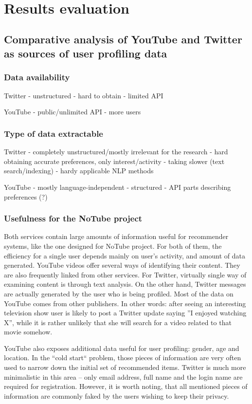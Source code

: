 \section{Results evaluation}

\subsection{Comparative analysis of YouTube and Twitter as sources of user
profiling data}

\subsubsection{Data availability}
Twitter
- unstructured
- hard to obtain
- limited API

YouTube
- public/unlimited API
- more users

\subsubsection{Type of data extractable}
Twitter
- completely unstructured/mostly irrelevant for the research
- hard obtaining accurate preferences, only interest/activity
- taking slower (text search/indexing)
- hardy applicable NLP methods

YouTube
- mostly language-independent
- structured
- API parts describing preferences (?)

\subsubsection{Usefulness for the NoTube project}

Both services contain large amounts of information useful for recommender
systems, like the one designed for NoTube project. For both of them, the
efficiency for a single user depends mainly on user's activity, and amount of
data generated. YouTube videos offer several ways of identifying their content.
They are also frequently linked from other services. For Twitter, virtually single
way of examining content is through text analysis. On the other hand, Twitter
messages are actually generated by the user who is being profiled. Most of the data
on YouTube comes from other publishers. In other words: after seeing an
interesting television show user is likely to post a Twitter update saying ''I
enjoyed watching X'', while it is rather unlikely that she will search for a
video related to that movie somehow.

YouTube also exposes additional data useful for user profiling: gender, age and
location. In the ``cold start`` problem, those pieces of information are very
often used to narrow down the initial set of recommended items. Twitter is much
more minimalistic in this area -- only email address, full name and the login
name are required for registration. However, it is worth noting, that all
mentioned pieces of information are commonly faked by the users wishing to keep
their privacy.

